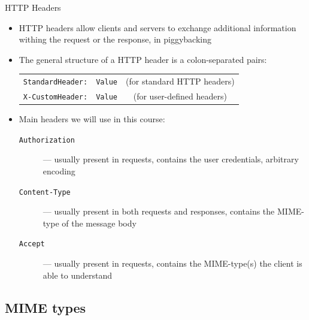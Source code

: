 \documentclass[presentation]{beamer}\mode<presentation>{\usetheme{AMSBolognaFC}}
\begin{document}
\begin{frame}{HTTP Headers}
    \begin{itemize}
        \item HTTP headers allow clients and servers to exchange additional information withing the request or the response, in \alert{piggybacking}

        \vfill

        \item The general structure of a HTTP header is a colon-separated pairs:
        \begin{center}
        \begin{tabular}{rlc}
            \texttt{StandardHeader\alert{:}} & \texttt{Value} & {\tiny{}(for standard HTTP headers)}
            \\
            \texttt{\alert{X-}CustomHeader\alert{:}} & \texttt{Value} & {\tiny{}(for user-defined headers)}
        \end{tabular}
        \end{center}

        \vfill

        \item Main headers we will use in this course:
        \begin{description}
            \item[\texttt{Authorization}] --- usually present in requests, contains the user credentials, arbitrary encoding
            \item[\texttt{Content-Type}] --- usually present in both requests and responses, contains the \alert{MIME-type} of the message body
            \item[\texttt{Accept}] --- usually present in requests, contains the \alert{MIME-type(s)} the client is able to understand
        \end{description}
    \end{itemize}
\end{frame}

\subsection{MIME types}
\end{document}
